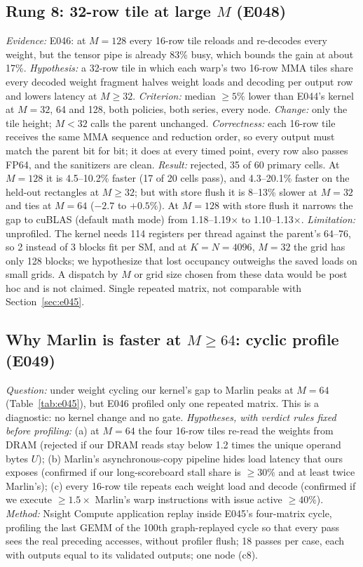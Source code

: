 \documentclass[sigconf,nonacm]{acmart}
\begin{document}
\subsection{Rung 8: 32-row tile at large $M$ (E048)}
\emph{Evidence:} E046: at $M=128$ every 16-row tile reloads and re-decodes every weight, but the tensor pipe is already 83\% busy, which bounds the gain at about 17\%. \emph{Hypothesis:} a 32-row tile in which each warp's two 16-row MMA tiles share every decoded weight fragment halves weight loads and decoding per output row and lowers latency at $M \ge 32$. \emph{Criterion:} median $\ge 5\%$ lower than E044's kernel at $M=32$, 64 and 128, both policies, both series, every node. \emph{Change:} only the tile height; $M<32$ calls the parent unchanged. \emph{Correctness:} each 16-row tile receives the same MMA sequence and reduction order, so every output must match the parent bit for bit; it does at every timed point, every row also passes FP64, and the sanitizers are clean. \emph{Result:} rejected, 35 of 60 primary cells. At $M=128$ it is 4.5--10.2\% faster (17 of 20 cells pass), and 4.3--20.1\% faster on the held-out rectangles at $M \ge 32$; but with store flush it is 8--13\% slower at $M=32$ and ties at $M=64$ ($-2.7$ to $+0.5\%$). At $M=128$ with store flush it narrows the gap to cuBLAS (default math mode) from 1.18--1.19$\times$ to 1.10--1.13$\times$. \emph{Limitation:} unprofiled. The kernel needs 114 registers per thread against the parent's 64--76, so 2 instead of 3 blocks fit per SM, and at $K=N=4096$, $M=32$ the grid has only 128 blocks; we hypothesize that lost occupancy outweighs the saved loads on small grids. A dispatch by $M$ or grid size chosen from these data would be post hoc and is not claimed. Single repeated matrix, not comparable with Section~\ref{sec:e045}.

\subsection{Why Marlin is faster at $M \ge 64$: cyclic profile (E049)}
\label{sec:e049}
\emph{Question:} under weight cycling our kernel's gap to Marlin peaks at $M=64$ (Table~\ref{tab:e045}), but E046 profiled only one repeated matrix. This is a diagnostic: no kernel change and no gate. \emph{Hypotheses, with verdict rules fixed before profiling:} (a) at $M=64$ the four 16-row tiles re-read the weights from DRAM (rejected if our DRAM reads stay below 1.2 times the unique operand bytes $U$); (b) Marlin's asynchronous-copy pipeline hides load latency that ours exposes (confirmed if our long-scoreboard stall share is $\ge 30\%$ and at least twice Marlin's); (c) every 16-row tile repeats each weight load and decode (confirmed if we execute $\ge 1.5\times$ Marlin's warp instructions with issue active $\ge 40\%$). \emph{Method:} Nsight Compute application replay inside E045's four-matrix cycle, profiling the last GEMM of the 100th graph-replayed cycle so that every pass sees the real preceding accesses, without profiler flush; 18 passes per case, each with outputs equal to its validated outputs; one node (c8).
\end{document}

